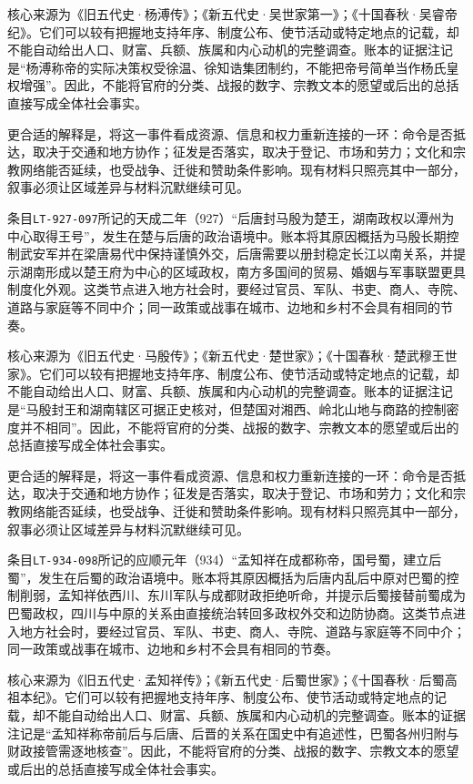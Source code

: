 核心来源为《旧五代史·杨溥传》；《新五代史·吴世家第一》；《十国春秋·吴睿帝纪》。它们可以较有把握地支持年序、制度公布、使节活动或特定地点的记载，却不能自动给出人口、财富、兵额、族属和内心动机的完整调查。账本的证据注记是“杨溥称帝的实际决策权受徐温、徐知诰集团制约，不能把帝号简单当作杨氏皇权增强”。因此，不能将官府的分类、战报的数字、宗教文本的愿望或后出的总括直接写成全体社会事实。

更合适的解释是，将这一事件看成资源、信息和权力重新连接的一环：命令是否抵达，取决于交通和地方协作；征发是否落实，取决于登记、市场和劳力；文化和宗教网络能否延续，也受战争、迁徙和赞助条件影响。现有材料只照亮其中一部分，叙事必须让区域差异与材料沉默继续可见。

条目\texttt{LT-927-097}所记的天成二年（927）“后唐封马殷为楚王，湖南政权以潭州为中心取得王号”，发生在楚与后唐的政治语境中。账本将其原因概括为马殷长期控制武安军并在梁唐易代中保持谨慎外交，后唐需要以册封稳定长江以南关系，并提示湖南形成以楚王府为中心的区域政权，南方多国间的贸易、婚姻与军事联盟更具制度化外观。这类节点进入地方社会时，要经过官员、军队、书吏、商人、寺院、道路与家庭等不同中介；同一政策或战事在城市、边地和乡村不会具有相同的节奏。

核心来源为《旧五代史·马殷传》；《新五代史·楚世家》；《十国春秋·楚武穆王世家》。它们可以较有把握地支持年序、制度公布、使节活动或特定地点的记载，却不能自动给出人口、财富、兵额、族属和内心动机的完整调查。账本的证据注记是“马殷封王和湖南辖区可据正史核对，但楚国对湘西、岭北山地与商路的控制密度并不相同”。因此，不能将官府的分类、战报的数字、宗教文本的愿望或后出的总括直接写成全体社会事实。

更合适的解释是，将这一事件看成资源、信息和权力重新连接的一环：命令是否抵达，取决于交通和地方协作；征发是否落实，取决于登记、市场和劳力；文化和宗教网络能否延续，也受战争、迁徙和赞助条件影响。现有材料只照亮其中一部分，叙事必须让区域差异与材料沉默继续可见。

条目\texttt{LT-934-098}所记的应顺元年（934）“孟知祥在成都称帝，国号蜀，建立后蜀”，发生在后蜀的政治语境中。账本将其原因概括为后唐内乱后中原对巴蜀的控制削弱，孟知祥依西川、东川军队与成都财政拒绝听命，并提示后蜀接替前蜀成为巴蜀政权，四川与中原的关系由直接统治转回多政权外交和边防协商。这类节点进入地方社会时，要经过官员、军队、书吏、商人、寺院、道路与家庭等不同中介；同一政策或战事在城市、边地和乡村不会具有相同的节奏。

核心来源为《旧五代史·孟知祥传》；《新五代史·后蜀世家》；《十国春秋·后蜀高祖本纪》。它们可以较有把握地支持年序、制度公布、使节活动或特定地点的记载，却不能自动给出人口、财富、兵额、族属和内心动机的完整调查。账本的证据注记是“孟知祥称帝前后与后唐、后晋的关系在国史中有追述性，巴蜀各州归附与财政接管需逐地核查”。因此，不能将官府的分类、战报的数字、宗教文本的愿望或后出的总括直接写成全体社会事实。

